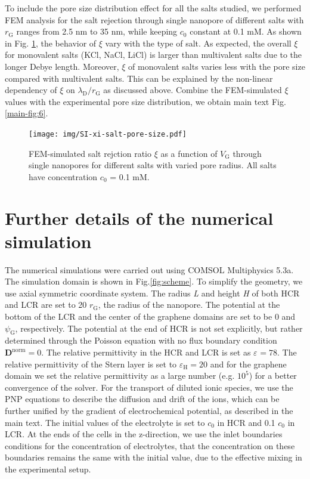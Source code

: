 \documentclass[manuscript=suppinfo,email=true, hyperref=true, keywords=false]{achemso}
\newcommand{\Fig}{Fig.}
\begin{document}
To include the pore size distribution effect for all the salts
studied, we performed FEM analysis for the salt rejection through
single nanopore of different salts with $r_{\mathrm{G}}$ ranges from
2.5 nm to 35 nm, while keeping $c_{0}$ constant at 0.1 mM. As shown in
\Fig{} \ref{fig:xi-salts-pore}, the behavior of $\xi$ vary with the
type of salt. As expected, the overall $\xi$ for monovalent salts
(KCl, NaCl, LiCl) is larger than multivalent salts due to the longer
Debye length. Moreover, $\xi$ of monovalent salts varies less with the
pore size compared with multivalent salts. This can be explained by
the non-linear dependency of $\xi$ on
$\lambda_{\mathrm{D}} / r_{\mathrm{G}}$ as discussed above. Combine
the FEM-simulated $\xi$ values with the experimental pore size
distribution, we obtain main text \Fig{} \ref{main-fig:6}.

\begin{figure}[htbp]
  \centering
   \texttt{[image: img/SI-xi-salt-pore-size.pdf]}
  \caption{FEM-simulated salt rejction ratio $\xi$ as a function of
    $V_{\mathrm{G}}$ through single nanopores for different salts with
    varied pore radius. All salts have concentration $c_{0}$ = 0.1 mM.}
  \label{fig:xi-salts-pore}
\end{figure}


\pagebreak




\section{Further details of the numerical simulation }
\label{sec:numer}

The numerical simulations were carried out using COMSOL Multiphysics
5.3a. The simulation domain is shown in \Fig \ref{fig:scheme}. To
simplify the geometry, we use axial symmetric coordinate system. The
radius \textit{L} and height \textit{H} of both HCR and LCR are set to
20 $r_{\mathrm{G}}$, the radius of the nanopore. The potential at the
bottom of the LCR and the center of the graphene domains are set to be
0 and $\psi_{\mathrm{G}}$, respectively. The potential at the end of
HCR is not set explicitly, but rather determined through the Poisson
equation with no flux boundary condition
$\boldsymbol{D}^{\mathrm{norm}}=0$. The relative permittivity in the
HCR and LCR is set as $\varepsilon_{\mathrm{}}=78$. The relative
permittivity of the Stern layer is set to
$\varepsilon_{\mathrm{H}}=20$\cite{Conway_1951} and for the graphene
domain we set the relative permittivity as a large number
(e.g. $10^{5}$) for a better convergence of the solver.  For the
transport of diluted ionic species, we use the PNP equations to
describe the diffusion and drift of the ions, which can be further
unified by the gradient of electrochemical potential, as described in
the main text. The initial values of the electrolyte is set to $c_{0}$
in HCR and 0.1 $c_{0}$ in LCR. At the ends of the cells in the
z-direction, we use the inlet boundaries conditions for the
concentration of electrolytes, that the concentration on these
boundaries remains the same with the initial value, due to the
effective mixing in the experimental setup.
\end{document}
